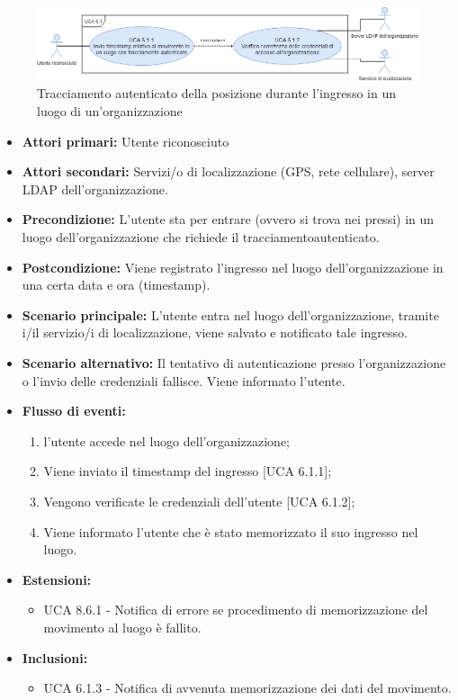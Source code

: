 \begin{figure}[h]
	\centering
	\includegraphics[scale=0.4, center]{sezioni/UseCase/Immagini/UCA6.1.png}
	\caption{Tracciamento autenticato della posizione durante l'ingresso in un luogo di un'organizzazione}
\end{figure}

\begin{itemize}
	\item \textbf{Attori primari:} Utente riconosciuto
	\item \textbf{Attori secondari:} Servizi/o di localizzazione (GPS, rete cellulare), server LDAP dell'organizzazione.
	\item \textbf{Precondizione:} L'utente sta per entrare (ovvero si trova nei pressi) in un luogo dell'organizzazione che richiede il tracciamentoautenticato.
	\item \textbf{Postcondizione:} Viene registrato l'ingresso nel luogo dell'organizzazione in una certa data e ora (timestamp).
	\item \textbf{Scenario principale:} L'utente entra nel luogo dell'organizzazione, tramite i/il servizio/i di localizzazione, viene salvato e notificato tale ingresso.
	\item \textbf{Scenario alternativo:} Il tentativo di autenticazione presso l'organizzazione o l'invio delle credenziali fallisce. Viene informato l'utente.
	\item \textbf{Flusso di eventi:}
	\begin{enumerate}
		\item l'utente accede nel luogo dell'organizzazione;
		\item Viene inviato il timestamp\ap{G}  del ingresso [UCA 6.1.1];
		\item Vengono verificate le credenziali dell'utente [UCA 6.1.2];
		\item Viene informato l'utente che è stato memorizzato il suo ingresso nel luogo.
	\end{enumerate}
	\item \textbf{Estensioni:}
	\begin{itemize}
		\item UCA 8.6.1 - Notifica di errore se procedimento di memorizzazione del movimento al luogo è fallito.
	\end{itemize}
	\item \textbf{Inclusioni:}
	\begin{itemize}
		\item UCA 6.1.3 - Notifica di avvenuta memorizzazione dei dati del movimento.
	\end{itemize}
\end{itemize}

